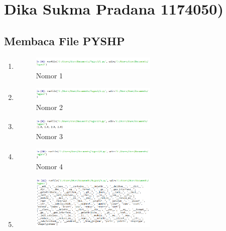\section{Dika Sukma Pradana 1174050)}
\subsection{Membaca File PYSHP}
\begin{enumerate}
    \item 
    
    \begin{figure}[H]
		\includegraphics[width=6cm]{figures/1174050/Tugas3/1.png}
		\centering
		\caption{Nomor 1}
	\end{figure}
    \item 
    
    \begin{figure}[H]
		\includegraphics[width=6cm]{figures/1174050/Tugas3/2.png}
		\centering
		\caption{Nomor 2}
    \end{figure}
    \item 
    
    \begin{figure}[H]
		\includegraphics[width=6cm]{figures/1174050/Tugas3/3.png}
		\centering
		\caption{Nomor 3}
    \end{figure}
    \item 
    
    \begin{figure}[H]
		\includegraphics[width=6cm]{figures/1174050/Tugas3/4.png}
		\centering
		\caption{Nomor 4}
    \end{figure}
    \item 
    
    \begin{figure}[H]
		\includegraphics[width=6cm]{figures/1174050/Tugas3/5.png}

\end{figure}
\end{enumerate}
